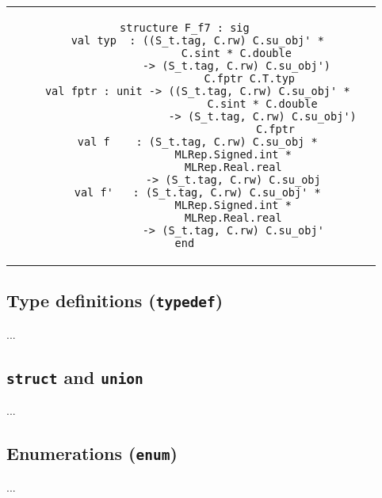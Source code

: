 \documentclass[titlepage,letterpaper]{article}
\begin{document}
\begin{small}
\begin{center}
\begin{tabular}{c|c}
\begin{minipage}{4in}
\begin{verbatim}
structure F_f7 : sig
    val typ  : ((S_t.tag, C.rw) C.su_obj' *
                C.sint * C.double
                -> (S_t.tag, C.rw) C.su_obj')
                    C.fptr C.T.typ
    val fptr : unit -> ((S_t.tag, C.rw) C.su_obj' *
                        C.sint * C.double
                        -> (S_t.tag, C.rw) C.su_obj')
                            C.fptr
    val f    : (S_t.tag, C.rw) C.su_obj *
               MLRep.Signed.int *
               MLRep.Real.real
               -> (S_t.tag, C.rw) C.su_obj
    val f'   : (S_t.tag, C.rw) C.su_obj' *
               MLRep.Signed.int *
               MLRep.Real.real
               -> (S_t.tag, C.rw) C.su_obj'
end

\end{verbatim}
\end{minipage}
\end{tabular}
\end{center}
\end{small}

\subsection{Type definitions ({\tt typedef})}

...

\subsection{{\tt struct} and {\tt union}}

...

\subsection{Enumerations ({\tt enum})}

...

%


\end{document}
